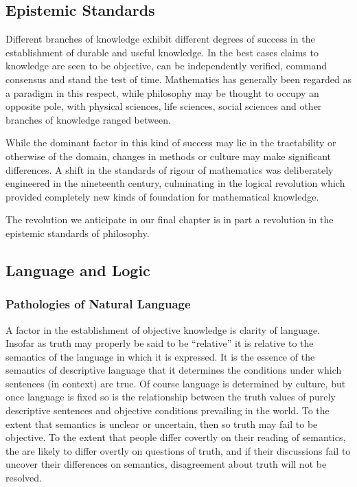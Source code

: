 \subsection{Epistemic Standards}

Different branches of knowledge exhibit different degrees of success in the establishment of durable and useful knowledge.
In the best cases claims to knowledge are seen to be objective, can be independently verified, command consensus and stand the test of time.
Mathematics has generally been regarded as a paradigm in this respect, while philosophy may be thought to occupy an opposite pole, with physical sciences, life sciences, social sciences and other branches of knowledge ranged between.

While the dominant factor in this kind of success may lie in the tractability or otherwise of the domain, changes in methods or culture may make significant differences.
A shift in the standards of rigour of mathematics was deliberately engineered in the nineteenth century, culminating in the logical revolution which provided completely new kinds of foundation for mathematical knowledge.

The revolution we anticipate in our final chapter is in part a revolution in the epistemic standards of philosophy.

\subsection{Language and Logic}

\subsubsection{Pathologies of Natural Language}

A factor in the establishment of objective knowledge is clarity of language.
Insofar as truth may properly be said to be ``relative'' it is relative to the semantics of the language in which it is expressed.
It is the essence of the semantics of descriptive language that it determines the conditions under which sentences (in context) are true.
Of course language is determined by culture, but once language is fixed so is the relationship between the truth values of purely descriptive sentences and objective conditions prevailing in the world. 
To the extent that semantics is unclear or uncertain, then so truth may fail to be objective.
To the extent that people differ covertly on their reading of semantics, the are likely to differ overtly on questions of truth, and if their discussions fail to uncover their differences on semantics, disagreement about truth will not be resolved.

